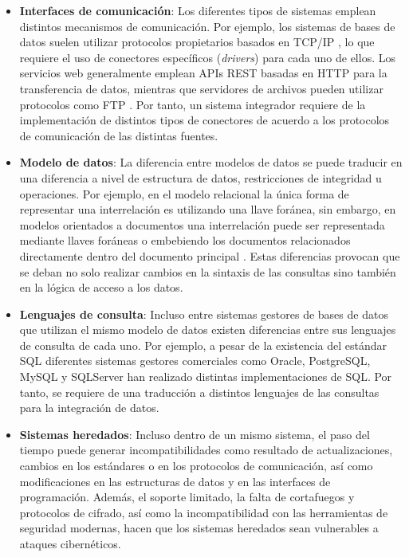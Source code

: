     \begin{itemize}
        \item \textbf{Interfaces de comunicación}: Los diferentes tipos de sistemas emplean distintos mecanismos de comunicación. 
        Por ejemplo, los sistemas de bases de datos suelen utilizar protocolos propietarios basados en TCP/IP \cite{eddy2022tcp}, lo que requiere el uso de conectores específicos (\textit{drivers}) para cada uno de ellos.
        Los servicios web generalmente emplean APIs REST basadas en HTTP \cite{bishop2022http} para la transferencia de datos, mientras que servidores de archivos pueden utilizar protocolos como FTP \cite{rfc4217ftp}. Por tanto, un sistema
        integrador requiere de la implementación de distintos tipos de conectores de acuerdo a los protocolos de comunicación de las distintas fuentes.
        
        \item \textbf{Modelo de datos}: La diferencia entre modelos de datos se puede traducir en una diferencia a nivel
        de estructura de datos, restricciones de integridad u operaciones. Por ejemplo, en el modelo relacional la única forma
        de representar una interrelación es utilizando una llave foránea, sin embargo, en modelos orientados a documentos una
        interrelación puede ser representada mediante llaves foráneas o embebiendo los documentos relacionados directamente dentro
        del documento principal \cite{mongodb2024embedding}. Estas diferencias provocan que se deban no solo realizar cambios en la
        sintaxis de las consultas sino también en la lógica de acceso a los datos.

        \item \textbf{Lenguajes de consulta}: Incluso entre sistemas gestores de bases de datos que utilizan el mismo modelo
        de datos existen diferencias entre sus lenguajes de consulta de cada uno. Por ejemplo, a pesar de la existencia
        del estándar SQL diferentes sistemas gestores comerciales como Oracle, PostgreSQL, MySQL y SQLServer han realizado
        distintas implementaciones de SQL. Por tanto, se requiere de una traducción a distintos lenguajes de las consultas para
        la integración de datos.

        \item \textbf{Sistemas heredados}: Incluso dentro de un mismo sistema, el paso del tiempo puede generar incompatibilidades 
        como resultado de actualizaciones, cambios en los estándares o en los protocolos de comunicación, 
        así como modificaciones en las estructuras de datos y en las interfaces de programación.
        Además, el soporte limitado, la falta de cortafuegos y protocolos de cifrado, así como la incompatibilidad con las 
        herramientas de seguridad modernas, hacen que los sistemas heredados sean vulnerables a ataques cibernéticos.
    \end{itemize}

